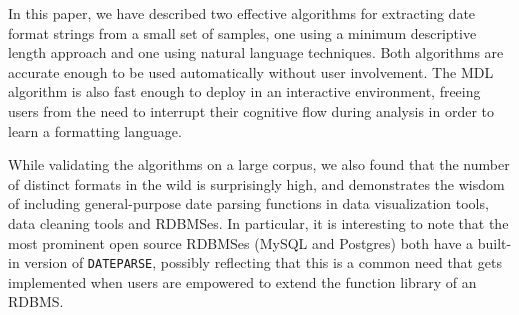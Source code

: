 In this paper, we have described two effective algorithms for extracting date format strings from a small set of samples, one using a minimum descriptive length approach and one using natural language techniques. Both algorithms are accurate enough to be used automatically without user involvement. The MDL algorithm is also fast enough to deploy in an interactive environment, freeing users from the need to interrupt their cognitive flow during analysis in order to learn a formatting language.

While validating the algorithms on a large corpus, we also found that the number of distinct formats in the wild is surprisingly high, and demonstrates the wisdom of including general-purpose date parsing functions in data visualization tools, data cleaning tools and RDBMSes. In particular, it is interesting to note that the most prominent open source RDBMSes (\eg MySQL and Postgres) both have a built-in version of \texttt{DATEPARSE}, possibly reflecting that this is a common need that gets implemented when users are empowered to extend the function library of an RDBMS.